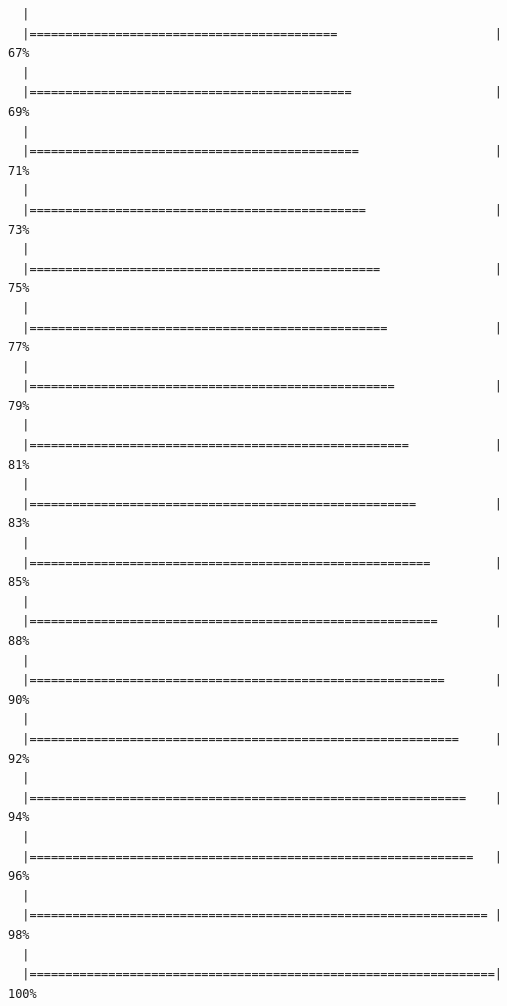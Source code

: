 \documentclass[]{book}
\begin{document}
\begin{verbatim}
  |                                                                       
  |===========================================                      |  67%
  |                                                                       
  |=============================================                    |  69%
  |                                                                       
  |==============================================                   |  71%
  |                                                                       
  |===============================================                  |  73%
  |                                                                       
  |=================================================                |  75%
  |                                                                       
  |==================================================               |  77%
  |                                                                       
  |===================================================              |  79%
  |                                                                       
  |=====================================================            |  81%
  |                                                                       
  |======================================================           |  83%
  |                                                                       
  |========================================================         |  85%
  |                                                                       
  |=========================================================        |  88%
  |                                                                       
  |==========================================================       |  90%
  |                                                                       
  |============================================================     |  92%
  |                                                                       
  |=============================================================    |  94%
  |                                                                       
  |==============================================================   |  96%
  |                                                                       
  |================================================================ |  98%
  |                                                                       
  |=================================================================| 100%
\end{verbatim}
\end{document}
